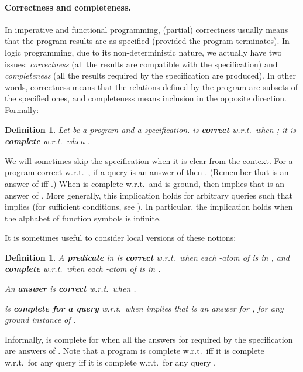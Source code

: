\documentclass{tlp}
\newtheorem{definition}[theorem]{Definition}
\begin{document}
\paragraph{Correctness and completeness.}
In imperative and functional programming, (partial) correctness usually means
that the program results are as specified (provided the program terminates).
  In logic programming, due to its non-deterministic nature,
we actually have two issues: {\em correctness} (all the results are
compatible with the specification) and {\em completeness} (all the results
required by the specification are produced). 
In other words, correctness means that the relations defined by the program are
subsets of the specified ones, and completeness means inclusion in the
opposite  direction. 
Formally:
\begin{definition}
\label{def:corr:compl}
Let  be a program and  a specification.
 is {\bf correct} w.r.t.\  when ;
it is {\bf complete} w.r.t.\  when .
\end{definition}
We will sometimes skip the specification when it is clear from the context.
For a program  correct w.r.t.\ ,
if a query  is an answer of  then .
(Remember that  is an answer of  iff .)
When  is complete w.r.t.\  and  is ground,
then  implies that  is an answer of . 
More generally, this implication holds for arbitrary queries such that
 implies 
(for sufficient conditions,
see \cite{DBLP:books/mk/minker88/Maher88,Apt-Prolog,drabent.tocl16,drabent.Herbrand.2016}).
In particular, the implication holds when the alphabet of function symbols is infinite.












\pagebreak[3]
It is sometimes useful to consider local versions of these notions:

\pagebreak[3]
\begin{definition}
\nopagebreak
\label{def:corr:compl:local}
\nopagebreak
A {\bf predicate}  in  is
{\bf correct} w.r.t.\  when each -atom of  is in , and 
 {\bf complete} w.r.t.\  when each -atom of  is in .

An {\bf answer}  is  {\bf correct} w.r.t.\  when .

 is {\bf complete for a query}  w.r.t.\  
when
 implies that  is an answer for ,
for any ground instance  of .
\end{definition}
Informally,   is complete for 
when 
all the answers for  required by the specification  are answers of .
Note that a program is complete w.r.t.\ 
 iff it is complete w.r.t.\  for any query
 iff it is complete w.r.t.\  for any query .
\end{document}
